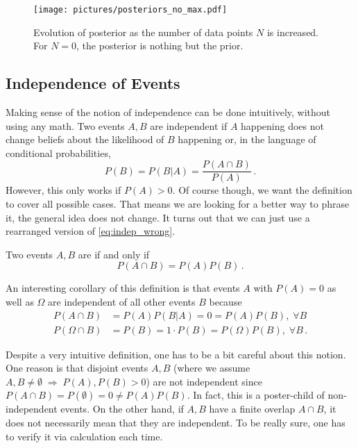 

\begin{figure}[t]
\centering

\texttt{[image: pictures/posteriors\_no\_max.pdf]}

\caption{Evolution of posterior as the number of data points $N$ is increased. For $N = 0$, the posterior is nothing but the prior.}
\label{fig:posteriors}
\end{figure}



	\subsection{Independence of Events}
Making sense of the notion of independence can be done intuitively, without using any math. Two events $A, B$ are independent if $A$ happening does not change beliefs about the likelihood of $B$ happening or, in the language of conditional probabilities,
\begin{equation}\label{eq:indep_wrong}
P(B) = P(B | A) = \frac{P(A \cap B)}{P(A)} \, .
\end{equation}
However, this only works if $P(A) > 0$. Of course though, we want the definition to cover all possible cases. That means we are looking for a better way to phrase it, the general idea does not change. It turns out that we can just use a rearranged version of \eqref{eq:indep_wrong}.
\begin{defi}
Two events $A, B$ are  if and only if
\begin{equation}
P(A \cap B) = P(A) P(B) \, .
\end{equation}
\end{defi}

An interesting corollary of this definition is that events $A$ with $P(A) = 0$ as well as $\Omega$ are independent of all other events $B$ because
\begin{align*}
P(A \cap B) &= P(A) P(B | A) = 0 = P(A) P(B), \; \forall B
\\
P(\Omega \cap B) &= P(B) = 1 \cdot P(B) = P(\Omega) P(B), \; \forall B \, .
\end{align*}


Despite a very intuitive definition, one has to be a bit careful about this notion. One reason is that disjoint events $A, B$ (where we assume $A, B \neq \emptyset\; \Rightarrow \; P(A), P(B) > 0$) are not independent since $P(A \cap B) = P(\emptyset) = 0 \neq P(A) P(B)$. In fact, this is a poster-child of non-independent events. On the other hand, if $A, B$ have a finite overlap $A \cap B$, it does not necessarily mean that they are independent. To be really sure, one has to verify it via calculation each time.

